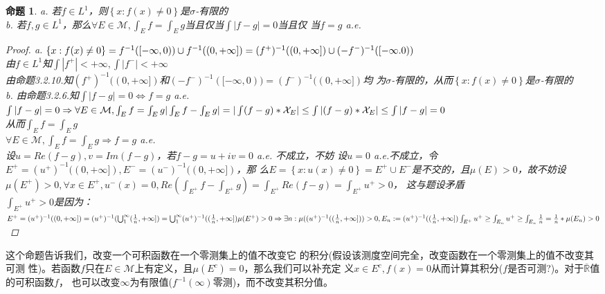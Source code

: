 \documentclass[12pt, a4paper, oneside]{ctexbook}
\newtheorem{proposition}[theorem]{命题}
\begin{document}
\begin{proposition}
    a. 若$f\in L^1$，则$\left\{x:f(x)\neq0\right\}$是$\sigma$-有限的\\
    b. 若$f,g\in L^1$，那么$\forall E\in\mathcal{M},\int_E f=\int_E g$当且仅当$\int|f-g|=0$当且仅
    当$f=g$ a.e.
    \begin{proof}
        a. $\left\{x:f(x)\neq 0\right\}=f^{-1}([-\infty,0))\cup f^{-1}((0,+\infty])\\
        =(f^+)^{-1}((0,+\infty])\cup(-f^-)^{-1}([-\infty.0))$\\
        由$f\in L^1$知$\int |f^+|<+\infty,\int |f^-|<+\infty$\\
        由命题3.2.10.知$(f^+)^{-1}((0,+\infty])$和$(-f^-)^{-1}([-\infty,0))=(f^-)^{-1}((0,+\infty])$均
        为$\sigma$-有限的，从而$\left\{x:f(x)\neq 0\right\}$是$\sigma$-有限的\\
        b. 由命题3.2.6.知$\int|f-g|=0\Leftrightarrow f=g$ a.e.\\
        $\int|f-g|=0\Rightarrow \forall E\in\mathcal{M},\int_E f=\int_E g\\
        |\int_E f-\int_E g|=|\int(f-g)*\mathcal{X}_E|\leq\int|(f-g)*\mathcal{X}_E|\leq\int|f-g|=0$\\
        从而$\int_E f=\int_E g$\\
        $\forall E\in\mathcal{M},\int_E f=\int_E g\Rightarrow f=g$ a.e.\\
        设$u=Re(f-g),v=Im(f-g)$，若$f-g=u+iv=0$ a.e. 不成立，不妨
        设$u=0$ a.e.不成立，令$E^+=(u^+)^{-1}((0,+\infty]),E^-=(u^-)^{-1}((0,+\infty])$，那
        么$E=\left\{x:u(x)\neq 0\right\}=E^+\cup E^-$是不交的，且$\mu(E)>0$，故不妨设$\mu(E^+)>
        0,\forall x\in E^+,u^-(x)=0,Re(\int_{E^+}f-\int_{E^+}g)=\int_{E^+}Re(f-g)=\int_{E^+}u^+>0$，
        这与题设矛盾\\
        $\int_{E^+}u^+>0$是因为：\\
        $E^+=(u^+)^{-1}((0,+\infty])=(u^+)^{-1}(\bigcup_1^{\infty}(\frac{1}{n},+\infty])=\bigcup_1^{\infty}(u^+)^{-1}((\frac{1}{n},+\infty])\\
        \mu(E^+)>0\Rightarrow\exists n:\mu((u^+)^{-1}((\frac{1}{n},+\infty]))>0,E_n:=(u^+)^{-1}((\frac{1}{n},+\infty])\\
        \int_{E^+}u^+\geq\int_{E_n}u^+\geq\int_{E_n}\frac{1}{n}=\frac{1}{n}*\mu(E_n)>0$
    \end{proof}
\end{proposition}
这个命题告诉我们，改变一个可积函数在一个零测集上的值不改变它
的积分(假设该测度空间完全，改变函数在一个零测集上的值不改变其可测
性)。若函数$f$只在$E\in\mathcal{M}$上有定义，且$\mu(E^c)=0$，那么我们可以补充定
义$x\in E^c,f(x)=0$从而计算其积分($f$是否可测?)。对于$\overline{\mathbb{R}}$值的可积函数$f$，
也可以改变$\infty$为有限值($f^{-1}(\infty)$零测)，而不改变其积分值。
\end{document}
